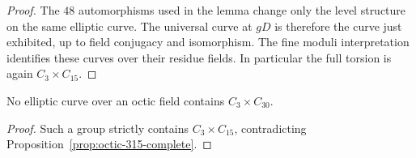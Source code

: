 \begin{proof}
The $48$ automorphisms used in the lemma change only the level
structure on the same elliptic curve. The universal curve at
$gD$ is therefore the curve just exhibited, up to field
conjugacy and isomorphism. The fine moduli interpretation
identifies these curves over their residue fields. In particular
the full torsion is again $C_3\times C_{15}$.
\end{proof}

\begin{corollary}\label{cor:octic-no330}
No elliptic curve over an octic field contains $C_3\times C_{30}$.
\end{corollary}
\begin{proof}
Such a group strictly contains $C_3\times C_{15}$, contradicting
Proposition~\ref{prop:octic-315-complete}.
\end{proof}

